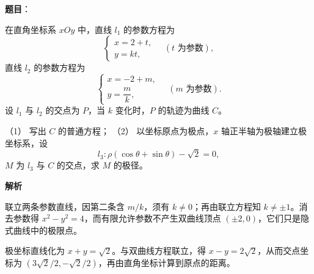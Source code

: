 \begin{answer}

\textbf{题目}：

在直角坐标系 \(xOy\) 中，直线 \(l_1\) 的参数方程为
\nopagebreak[4]
\[
\begin{cases}
x=2+t,\\
y=kt,
\end{cases}
\quad(t\text{ 为参数}),
\]
直线 \(l_2\) 的参数方程为
\nopagebreak[4]
\[
\begin{cases}
x=-2+m,\\
y=\dfrac{m}{k},
\end{cases}
\quad(m\text{ 为参数}).
\]
设 \(l_1\) 与 \(l_2\) 的交点为 \(P\)，当 \(k\) 变化时，\(P\) 的轨迹为曲线 \(C\)。

（1） 写出 \(C\) 的普通方程；
（2） 以坐标原点为极点，\(x\) 轴正半轴为极轴建立极坐标系，设
\nopagebreak[4]
\[
l_3:\rho(\cos\theta+\sin\theta)-\sqrt{2}=0,
\]
\(M\) 为 \(l_3\) 与 \(C\) 的交点，求 \(M\) 的极径。

\enlargethispage{4\baselineskip}

\textbf{解析}


联立两条参数直线，因第二条含 \(m/k\)，须有 \(k\ne0\)；再由联立方程知 \(k\ne\pm1\)。消去参数得 \(x^2-y^2=4\)，而有限允许参数不产生双曲线顶点 \((\pm2,0)\)，它们只是隐式曲线中的极限点。


极坐标直线化为 \(x+y=\sqrt2\)。与双曲线方程联立，得 \(x-y=2\sqrt2\)，从而交点坐标为 \((3\sqrt2/2,-\sqrt2/2)\)，再由直角坐标计算到原点的距离。




\end{answer}

